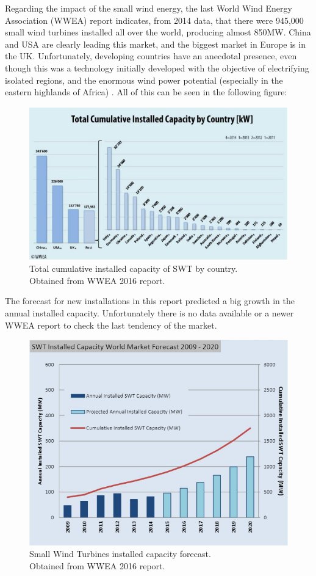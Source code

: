 \documentclass[../TFG_Report.tex]{subfiles}
\begin{document}
Regarding the impact of the small wind energy, the last World Wind Energy Association (WWEA) report indicates, from 2014 data, that there were 945,000 small wind turbines installed all over the world, producing almost 850MW. China and USA are clearly leading this market, and the biggest market in Europe is in the UK. Unfortunately, developing countries have an anecdotal presence, even though this was a technology initially developed with the objective of electrifying isolated regions, and the enormous wind power potential (especially in the eastern highlands of Africa) . All of this can be seen in the following figure: 

\begin{figure}[h!]
	\centering
	\includegraphics[width=0.85\linewidth]{Images/Total_cumulative_instlled_capacity}
	\caption[Total cumulative installed capacity of SWT by country]{Total cumulative installed capacity of SWT by country. \\
		Obtained from WWEA 2016 report.}
	\label{fig:totalcumulativeinstlledcapacity}
\end{figure}

The forecast for new installations in this report predicted a big growth in the annual installed capacity. Unfortunately there is no data available or a newer WWEA report to check the last tendency of the market. 

\begin{figure}[h!]
	\centering
	\includegraphics[width=0.85\linewidth]{Images/SWT_Installed_capacity_forecast}
	\caption[SWT installed capacity forecast]{Small Wind Turbines installed capacity forecast. \\
		Obtained from WWEA 2016 report.}
	\label{fig:swtinstalledcapacityforecast}
\end{figure}
\end{document}
